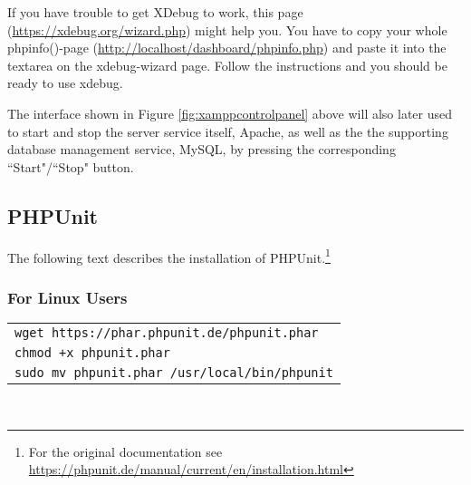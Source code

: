 If you have trouble to get XDebug to work, this page (\url{https://xdebug.org/wizard.php}) might help you. You have to copy your whole phpinfo()-page (\url{http://localhost/dashboard/phpinfo.php}) and paste it into the textarea on the xdebug-wizard page. Follow the instructions and you should be ready to use xdebug.

\noindent
The interface shown in Figure \ref{fig:xamppcontrolpanel} above will also later used to start and stop the server service itself, Apache, as well as the the supporting database management service, MySQL, by pressing the corresponding ``Start"/``Stop" button.

\newpage
\subsection{PHPUnit}
The following text describes the installation of PHPUnit.\footnote{For the original documentation see \url{https://phpunit.de/manual/current/en/installation.html}}

\subsubsection{For Linux Users}
\begin{tabular}{l}
	\texttt{wget https://phar.phpunit.de/phpunit.phar}\\
	\texttt{chmod +x phpunit.phar}\\
	\texttt{sudo mv phpunit.phar /usr/local/bin/phpunit}\\
\end{tabular}\\

